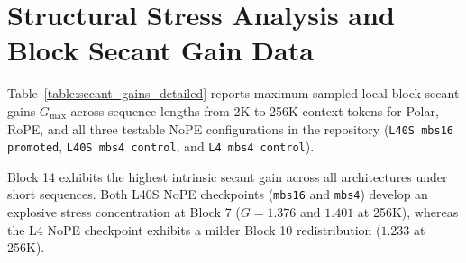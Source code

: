 \documentclass{article} %
\begin{document}
\begin{table}[h!]
\centering
\small
\setlength{\tabcolsep}{5pt}
\caption{Systems-scale throughput comparison between ATMA's custom Triton engine (9.2B parameter stress shape) and production vLLM 0.25.0 serving Qwen3.5-9B on one NVIDIA L40S GPU (BF16, greedy sampling).}
\label{table:vllm_comparison_matrix}
\end{table}

\clearpage
\section{Structural Stress Analysis and Block Secant Gain Data}
\label{appendix:stress_fea}
Table~\ref{table:secant_gains_detailed} reports maximum sampled local block secant gains $G_{\mathrm{max}}$ across sequence lengths from 2K to 256K context tokens for Polar, RoPE, and all three testable NoPE configurations in the repository (\texttt{L40S mbs16 promoted}, \texttt{L40S mbs4 control}, and \texttt{L4 mbs4 control}).

Block 14 exhibits the highest intrinsic secant gain across all architectures under short sequences. Both L40S NoPE checkpoints (\texttt{mbs16} and \texttt{mbs4}) develop an explosive stress concentration at Block 7 ($G=1.376$ and $1.401$ at 256K), whereas the L4 NoPE checkpoint exhibits a milder Block 10 redistribution ($1.233$ at 256K).
\end{document}
